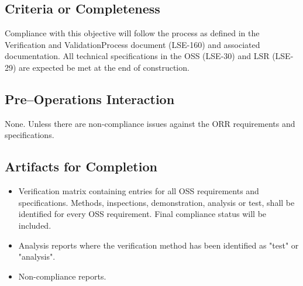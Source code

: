 \subsection{Criteria or Completeness}
Compliance with this objective will follow the process as defined in the Verification and ValidationProcess document (LSE-160) and associated documentation.   All technical specifications in the OSS (LSE-30) and LSR (LSE-29) are expected be met at the end of construction.

\subsection{Pre--Operations Interaction}
None.  Unless there are non-compliance issues against the ORR requirements and specifications.

\subsection{Artifacts for Completion}

\begin{itemize}
 
	\item Verification matrix containing entries for all OSS requirements and specifications.  Methods, inspections, demonstration, analysis or test, shall be identified for every OSS requirement.  Final compliance status will be included.

	\item Analysis reports where the verification method has been identified as "test" or "analysis".
	\item Non-compliance reports.

\end{itemize}